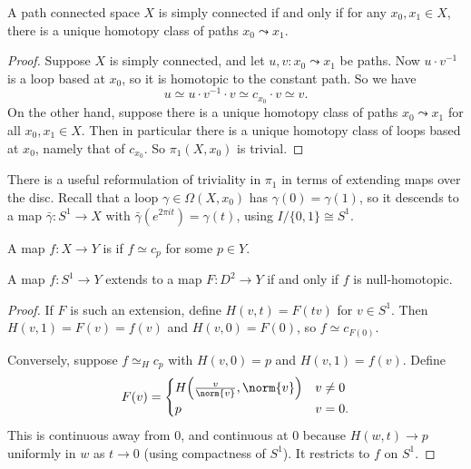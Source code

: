 \begin{lemma} \label{lem:sc-unique-path}
	A path connected space $X$ is simply connected if and only if for any $x_0, x_1 \in X$, there is a unique homotopy class of paths $x_0 \leadsto x_1$.
\end{lemma}
\begin{proof}
	Suppose $X$ is simply connected, and let $u, v: x_0 \leadsto x_1$ be paths. Now $u \cdot v^{-1}$ is a loop based at $x_0$, so it is homotopic to the constant path. So we have
	$$
	u \simeq u \cdot v^{-1} \cdot v \simeq c_{x_0} \cdot v \simeq v.
	$$
	On the other hand, suppose there is a unique homotopy class of paths $x_0 \leadsto x_1$ for all $x_0, x_1 \in X$. Then in particular there is a unique homotopy class of loops based at $x_0$, namely that of $c_{x_0}$. So $\pi_1(X, x_0)$ is trivial.
\end{proof}

There is a useful reformulation of triviality in $\pi_1$ in terms of extending maps over
the disc. Recall that a loop $\gamma \in \Omega(X, x_0)$ has $\gamma(0) = \gamma(1)$, so
it descends to a map $\bar\gamma: S^1 \to X$ with $\bar{\gamma}(e^{2\pi i t}) = \gamma(t)$,
using $I/\{0,1\} \cong S^1$.

\begin{definition}
	A map $f: X \to Y$ is  if $f \simeq c_p$ for some $p \in Y$.
\end{definition}

\begin{lemma} \label{lem:extend-disc}
	A map $f: S^1 \to Y$ extends to a map $F: D^2 \to Y$ if and only if $f$ is null-homotopic.
\end{lemma}
\begin{proof}
	If $F$ is such an extension, define $H(v, t) = F(tv)$ for $v \in S^1$. Then $H(v,1) = F(v) = f(v)$ and $H(v, 0) = F(0)$, so $f \simeq c_{F(0)}$.

	Conversely, suppose $f \simeq_H c_p$ with $H(v, 0) = p$ and $H(v,1) = f(v)$. Define
	$$
	F(v) = \begin{cases} H\!\left(\frac{v}{\norm{v}}, \norm{v}\right) & v \neq 0 \\ p & v = 0.\end{cases}
	$$
	This is continuous away from $0$, and continuous at $0$ because $H(w, t) \to p$ uniformly in $w$ as $t \to 0$ (using compactness of $S^1$). It restricts to $f$ on $S^1$.
\end{proof}

